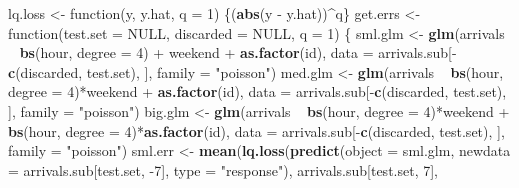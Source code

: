 \documentclass[]{article}
\newenvironment{Shaded}{\begin{snugshade}}{\end{snugshade}}
\newcommand{\KeywordTok}[1]{\textcolor[rgb]{0.13,0.29,0.53}{\textbf{{#1}}}}
\newcommand{\DataTypeTok}[1]{\textcolor[rgb]{0.13,0.29,0.53}{{#1}}}
\newcommand{\DecValTok}[1]{\textcolor[rgb]{0.00,0.00,0.81}{{#1}}}
\newcommand{\StringTok}[1]{\textcolor[rgb]{0.31,0.60,0.02}{{#1}}}
\newcommand{\OtherTok}[1]{\textcolor[rgb]{0.56,0.35,0.01}{{#1}}}
\newcommand{\NormalTok}[1]{{#1}}
\begin{document}
\begin{Shaded}
\begin{Highlighting}[]
\NormalTok{lq.loss <-}\StringTok{ }\NormalTok{function(y, y.hat, }\DataTypeTok{q =} \DecValTok{1}\NormalTok{) \{(}\KeywordTok{abs}\NormalTok{(y -}\StringTok{ }\NormalTok{y.hat))^q\}}
\NormalTok{get.errs <-}\StringTok{ }\NormalTok{function(}\DataTypeTok{test.set =} \OtherTok{NULL}\NormalTok{,}
                     \DataTypeTok{discarded =} \OtherTok{NULL}\NormalTok{,}
                     \DataTypeTok{q =} \DecValTok{1}\NormalTok{) \{}
    \NormalTok{sml.glm <-}\StringTok{ }\KeywordTok{glm}\NormalTok{(arrivals ~}
\StringTok{                   }\KeywordTok{bs}\NormalTok{(hour, }\DataTypeTok{degree =} \DecValTok{4}\NormalTok{)}
                   \NormalTok{+}\StringTok{ }\NormalTok{weekend}
                   \NormalTok{+}\StringTok{ }\KeywordTok{as.factor}\NormalTok{(id),}
                   \DataTypeTok{data =} \NormalTok{arrivals.sub[-}\KeywordTok{c}\NormalTok{(discarded, test.set), ],}
                   \DataTypeTok{family =} \StringTok{"poisson"}\NormalTok{)}
    \NormalTok{med.glm <-}\StringTok{ }\KeywordTok{glm}\NormalTok{(arrivals ~}
\StringTok{                   }\KeywordTok{bs}\NormalTok{(hour, }\DataTypeTok{degree =} \DecValTok{4}\NormalTok{)*weekend}
                   \NormalTok{+}\StringTok{ }\KeywordTok{as.factor}\NormalTok{(id),}
                   \DataTypeTok{data =} \NormalTok{arrivals.sub[-}\KeywordTok{c}\NormalTok{(discarded, test.set), ],}
                   \DataTypeTok{family =} \StringTok{"poisson"}\NormalTok{)}
    \NormalTok{big.glm <-}\StringTok{ }\KeywordTok{glm}\NormalTok{(arrivals ~}
\StringTok{                   }\KeywordTok{bs}\NormalTok{(hour, }\DataTypeTok{degree =} \DecValTok{4}\NormalTok{)*weekend}
                   \NormalTok{+}\StringTok{ }\KeywordTok{bs}\NormalTok{(hour, }\DataTypeTok{degree =} \DecValTok{4}\NormalTok{)*}\KeywordTok{as.factor}\NormalTok{(id),}
                   \DataTypeTok{data =} \NormalTok{arrivals.sub[-}\KeywordTok{c}\NormalTok{(discarded, test.set), ],}
                   \DataTypeTok{family =} \StringTok{"poisson"}\NormalTok{)}
    \NormalTok{sml.err <-}\StringTok{ }\KeywordTok{mean}\NormalTok{(}\KeywordTok{lq.loss}\NormalTok{(}\KeywordTok{predict}\NormalTok{(}\DataTypeTok{object =} \NormalTok{sml.glm,}
                                    \DataTypeTok{newdata =} \NormalTok{arrivals.sub[test.set, -}\DecValTok{7}\NormalTok{],}
                                    \DataTypeTok{type =} \StringTok{"response"}\NormalTok{),}
                            \NormalTok{arrivals.sub[test.set, }\DecValTok{7}\NormalTok{],}

\end{Highlighting}
\end{Shaded}
\end{document}

